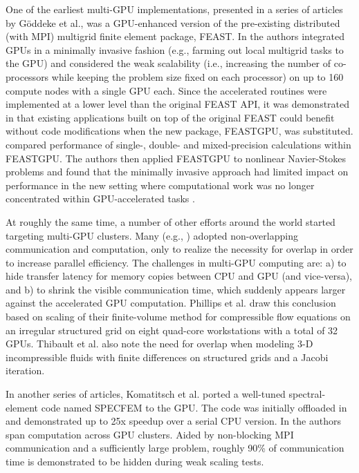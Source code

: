 \documentclass[11pt]{report}
\begin{document}
One of the earliest multi-GPU implementations, presented in a series of articles \cite{Goeddeke2007, Goeddeke2008a, Goeddeke2008b, Goeddeke2009a} by G\"{o}ddeke et al., was
a GPU-enhanced version of the pre-existing distributed (with MPI) multigrid finite element package, FEAST. In \cite{Goeddeke2007} the authors integrated 
GPUs in a minimally invasive fashion (e.g., farming out local multigrid tasks to the GPU) and considered the weak scalability (i.e., 
increasing the number of co-processors while keeping the problem size fixed on each processor) on up to 160 compute nodes with a 
single GPU each.  Since the accelerated routines were implemented at a lower level than the original FEAST API, it was demonstrated in 
\cite{Goeddeke2008a} that existing applications built on top of the original FEAST could benefit without code modifications when 
the 
new package, FEASTGPU, was substituted. \cite{Goeddeke2008b} compared performance of single-,  double- and 
mixed-precision calculations within FEASTGPU. The authors then applied FEASTGPU to nonlinear Navier-Stokes 
problems and 
found that the minimally invasive approach had limited impact on performance in the new setting where computational work was no longer  
concentrated within GPU-accelerated tasks \cite{Goeddeke2009a}. 

At roughly the same time, a number of other efforts around the world started targeting multi-GPU clusters. Many (e.g., \cite{Phillips2009, Thibault2009, Komatitsch2009}) adopted non-overlapping communication and computation, only to realize the necessity for overlap in order to increase parallel efficiency. The challenges in multi-GPU computing are: a) to hide transfer latency for memory copies between CPU and GPU (and vice-versa), and b) to shrink the visible communication time, which suddenly appears larger against the accelerated GPU computation.
Phillips et al. draw this conclusion based on scaling of their finite-volume method for compressible flow equations on an irregular structured grid on eight quad-core workstations with a total of 32 GPUs. 
Thibault et al. \cite{Thibault2009} also note the need for overlap when modeling 3-D incompressible fluids with finite differences on structured grids and a Jacobi iteration. %

In another series of articles, Komatitsch et al. \cite{Komatitsch2009, Komatitsch2010b,Komatitsch2010a} ported a well-tuned spectral-element code named SPECFEM to the GPU. The code was initially offloaded in \cite{Komatitsch2009} and demonstrated up to 25x speedup over a serial CPU version. In \cite{Komatitsch2010b,Komatitsch2010a} the authors span computation across GPU clusters. Aided by non-blocking MPI communication and a sufficiently large problem, roughly 90\% of communication time is demonstrated to be hidden during weak scaling tests. 
\end{document}
